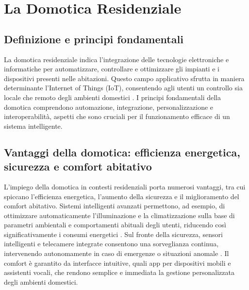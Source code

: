 \chapter{La Domotica Residenziale}

\section{Definizione e principi fondamentali}
La domotica residenziale indica l'integrazione delle tecnologie elettroniche e informatiche per automatizzare, controllare e ottimizzare gli impianti e i dispositivi presenti nelle abitazioni. Questo campo applicativo sfrutta in maniera determinante l'Internet of Things (IoT), consentendo agli utenti un controllo sia locale che remoto degli ambienti domestici \parencite{domoticaWiki}. I principi fondamentali della domotica comprendono automazione, integrazione, personalizzazione e interoperabilità, aspetti che sono cruciali per il funzionamento efficace di un sistema intelligente.

\section{Vantaggi della domotica: efficienza energetica, sicurezza e comfort abitativo}
L'impiego della domotica in contesti residenziali porta numerosi vantaggi, tra cui spiccano l'efficienza energetica, l'aumento della sicurezza e il miglioramento del comfort abitativo. Sistemi intelligenti avanzati permettono, ad esempio, di ottimizzare automaticamente l'illuminazione e la climatizzazione sulla base di parametri ambientali e comportamenti abituali degli utenti, riducendo così significativamente i consumi energetici \parencite{iecSmartHome}. Sul fronte della sicurezza, sensori intelligenti e telecamere integrate consentono una sorveglianza continua, intervenendo autonomamente in caso di emergenze o situazioni anomale \parencite{nistIoTSecurity}. Il comfort è garantito da interfacce intuitive, quali app per dispositivi mobili e assistenti vocali, che rendono semplice e immediata la gestione personalizzata degli ambienti domestici.

